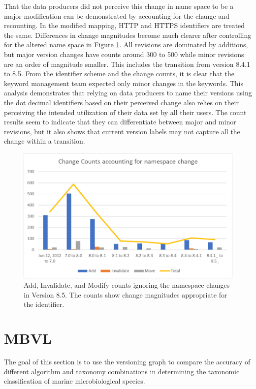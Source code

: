 That the data producers did not perceive this change in name space to be a major modification can be demonstrated by accounting for the change and recounting.
In the modified mapping, HTTP and HTTPS identifiers are treated the same.
Differences in change magnitudes become much clearer after controlling for the altered name space in Figure \ref{GCMDC2}.
All revisions are dominated by additions, but major version changes have counts around 300 to 500 while minor revisions are an order of magnitude smaller.
This includes the transition from version 8.4.1 to 8.5.
From the identifier scheme and the change counts, it is clear that the keyword management team expected only minor changes in the keywords.
This analysis demonstrates that relying on data producers to name their versions using the dot decimal identifiers based on their perceived change also relies on their perceiving the intended utilization of their data set by all their users.
The count results seem to indicate that they can differentiate between major and minor revisions, but it also shows that current version labels may not capture all the change within a transition.


\begin{figure}%
	\centering
	\includegraphics[scale=1]{figures/GCMDChart2.png}
	\caption{Add, Invalidate, and Modify counts ignoring the namespace changes in Version 8.5.  The counts show change magnitudes appropriate for the identifier.}
	\label{GCMDC2}
\end{figure}

\section{MBVL}


The goal of this section is to use the versioning graph to compare the accuracy of different algorithm and taxonomy combinations in determining the taxonomic classification of marine microbiological species.

